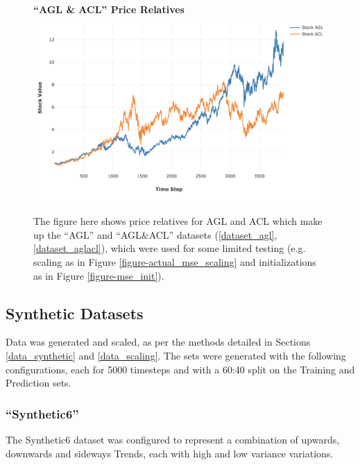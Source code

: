 \documentclass[a4paper,11pt,oneside]{article}
\theoremstyle{plain}
\theoremstyle{definition}
\begin{document}
	\begin{figure}[H]
		\centering
		\textbf{``AGL \& ACL'' Price Relatives}
		\includegraphics[scale=0.45]{images/results/prices/aglacl_prices.png} 
		\caption[``AGL\&ACL'' Price Relatives]{The figure here shows price relatives for AGL and ACL which make up the ``AGL'' and ``AGL\&ACL'' datasets (\ref{dataset_agl}, \ref{dataset_aglacl}), which were used for some limited testing (e.g. scaling as in Figure \ref{figure-actual_mse_scaling} and initializations as in Figure \ref{figure-mse_init}).}
		\label{figure-aglacl_prices}
	\end{figure}
	

	
	
	\subsection{Synthetic Datasets}
	
	Data was generated and scaled, as per the methods detailed in Sections \ref{data_synthetic} and \ref{data_scaling}. The sets were generated with the following configurations, each for 5000 timesteps and with a 60:40 split on the Training and Prediction sets.
	
	\subsubsection{``Synthetic6''} \label{dataset_synthetic6}
	
	The Synthetic6 dataset was configured to represent a combination of upwards, downwards and sideways Trends, each with high and low variance variations.
	
\end{document}
